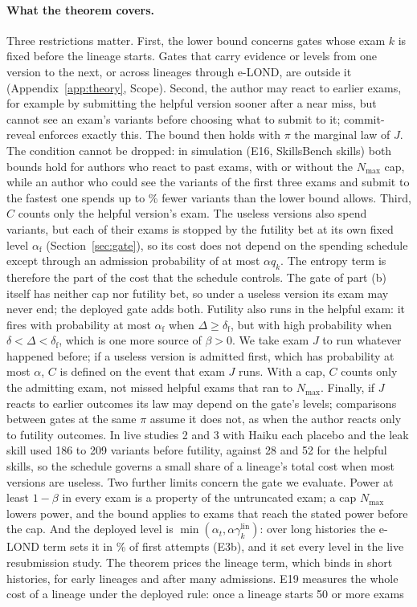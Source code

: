 \paragraph{What the theorem covers.} Three restrictions matter. First, the lower bound concerns gates whose exam $k$ is fixed before the lineage starts. Gates that carry evidence or levels from one version to the next, or across lineages through e-LOND, are outside it (Appendix~\ref{app:theory}, Scope). Second, the author may react to earlier exams, for example by submitting the helpful version sooner after a near miss, but cannot see an exam's variants before choosing what to submit to it; commit-reveal enforces exactly this. The bound then holds with $\pi$ the marginal law of $J$. The condition cannot be dropped: in simulation (E16, \NAdSkills{} SkillsBench skills) both bounds hold for authors who react to past exams, with or without the $N_{\max}$ cap, while an author who could see the variants of the first three exams and submit to the fastest one spends up to \NAdClairBelowMax\% fewer variants than the lower bound allows. Third, $C$ counts only the helpful version's exam. The useless versions also spend variants, but each of their exams is stopped by the futility bet at its own fixed level $\alpha_{\mathrm f}$ (Section~\ref{sec:gate}), so its cost does not depend on the spending schedule except through an admission probability of at most $\alpha q_k$. The entropy term is therefore the part of the cost that the schedule controls. The gate of part (b) itself has neither cap nor futility bet, so under a useless version its exam may never end; the deployed gate adds both. Futility also runs in the helpful exam: it fires with probability at most $\alpha_{\mathrm f}$ when $\Delta\ge\delta_{\mathrm f}$, but with high probability when $\delta<\Delta<\delta_{\mathrm f}$, which is one more source of $\beta>0$. We take exam $J$ to run whatever happened before; if a useless version is admitted first, which has probability at most $\alpha$, $C$ is defined on the event that exam $J$ runs. With a cap, $C$ counts only the admitting exam, not missed helpful exams that ran to $N_{\max}$. Finally, if $J$ reacts to earlier outcomes its law may depend on the gate's levels; comparisons between gates at the same $\pi$ assume it does not, as when the author reacts only to futility outcomes. In live studies 2 and 3 with Haiku each placebo and the leak skill used 186 to 209 variants before futility, against 28 and 52 for the helpful skills, so the schedule governs a small share of a lineage's total cost when most versions are useless. Two further limits concern the gate we evaluate. Power at least $1-\beta$ in every exam is a property of the untruncated exam; a cap $N_{\max}$ lowers power, and the bound applies to exams that reach the stated power before the cap. And the deployed level is $\min(\alpha_t,\alpha\gamma^{\text{lin}}_k)$: over long histories the e-LOND term sets it in \NEbElondBinds\% of first attempts (E3b), and it set every level in the live resubmission study. The theorem prices the lineage term, which binds in short histories, for early lineages and after many admissions. E19 measures the whole cost of a lineage under the deployed rule: once a lineage starts 50 or more exams 